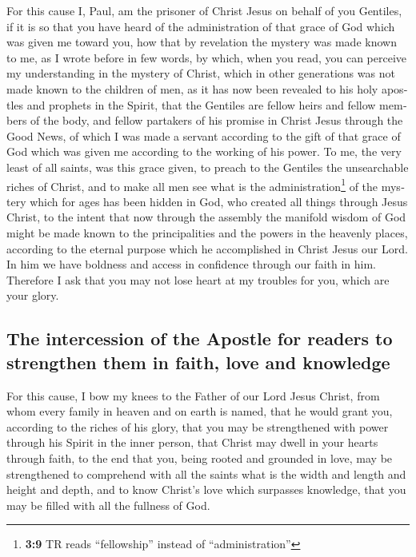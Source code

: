 \begin{paracol}{2}
\begin{otherlanguage}{english}
 For this cause I, Paul, am the prisoner of Christ Jesus
on behalf of you Gentiles,  if it is so that you have
heard of the administration of that grace of God which was given me
toward you,  how that by revelation the mystery was made
known to me, as I wrote before in few words,  by which,
when you read, you can perceive my understanding in the mystery of
Christ,  which in other generations was not made known to
the children of men, as it has now been revealed to his holy apostles
and prophets in the Spirit,  that the Gentiles are fellow
heirs and fellow members of the body, and fellow partakers of his
promise in Christ Jesus through the Good News,  of which I
was made a servant according to the gift of that grace of God which was
given me according to the working of his power.  To me,
the very least of all saints, was this grace given, to preach to the
Gentiles the unsearchable riches of Christ,  and to make
all men see what is the administration\footnote{\textbf{3:9} TR reads
  ``fellowship'' instead of ``administration''} of the mystery which for
ages has been hidden in God, who created all things through Jesus
Christ,  to the intent that now through the assembly the
manifold wisdom of God might be made known to the principalities and the
powers in the heavenly places,  according to the eternal
purpose which he accomplished in Christ Jesus our Lord. 
In him we have boldness and access in confidence through our faith in
him.  Therefore I ask that you may not lose heart at my
troubles for you, which are your glory.

\hypertarget{the-intercession-of-the-apostle-for-readers-to-strengthen-them-in-faith-love-and-knowledge}{%
\subsection{The intercession of the Apostle for readers to strengthen
them in faith, love and
knowledge}\label{the-intercession-of-the-apostle-for-readers-to-strengthen-them-in-faith-love-and-knowledge}}

 For this cause, I bow my knees to the Father of our Lord
Jesus Christ,  from whom every family in heaven and on
earth is named,  that he would grant you, according to
the riches of his glory, that you may be strengthened with power through
his Spirit in the inner person,  that Christ may dwell in
your hearts through faith, to the end that you, being rooted and
grounded in love,  may be strengthened to comprehend with
all the saints what is the width and length and height and depth,
 and to know Christ's love which surpasses knowledge,
that you may be filled with all the fullness of God.


\end{otherlanguage}
\end{paracol}
